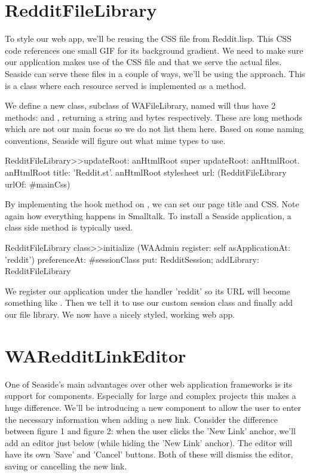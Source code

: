 \documentclass[a4paper,10pt,twoside]{book}
\begin{document}
\section{RedditFileLibrary}

To style our web app, we'll be reusing the CSS file from Reddit.lisp. This CSS code references one small GIF for its background gradient. We need to make sure our application makes use of the CSS file and that we serve the actual files. Seaside can serve these files in a couple of ways, we'll be using the  approach. This is a class where each resource served is implemented as a method.


We define a new class, subclass of WAFileLibrary, named  will thus have 2 methods:  and , returning a string and bytes respectively. These are long methods which are not our main focus so we do not list them here. Based on some naming conventions, Seaside will figure out what mime types to use.

\begin{code}{}
RedditFileLibrary>>updateRoot: anHtmlRoot
    super updateRoot: anHtmlRoot. 
    anHtmlRoot title: 'Reddit.st'. 
    anHtmlRoot stylesheet url: (RedditFileLibrary urlOf: #mainCss)
\end{code}

By implementing the  hook method on , we can set our page title and CSS. Note again how everything happens in Smalltalk. To install a Seaside application, a class side  method is typically used.

\begin{code}{}
RedditFileLibrary class>>initialize
   (WAAdmin register: self asApplicationAt: 'reddit') 
        preferenceAt: #sessionClass put: RedditSession; 
        addLibrary: RedditFileLibrary
\end{code}


We register our application under the handler 'reddit' so its URL will become something like . Then we tell it to use our custom session class and finally add our file library. We now have a nicely styled, working web app.

\section{WARedditLinkEditor}

One of Seaside's main advantages over other web application frameworks is its support for components. Especially for large and complex projects this makes a huge difference. We'll be introducing a new component to allow the user to enter the necessary information when adding a new link. Consider the difference between figure 1 and figure 2: when the user clicks the 'New Link' anchor, we'll add an editor just below (while hiding the 'New Link' anchor). The editor will have its own 'Save' and 'Cancel' buttons. Both of these will dismiss the editor, saving or cancelling the new link.
\end{document}

